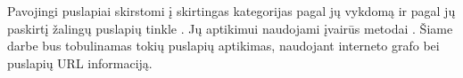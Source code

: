 
Pavojingi puslapiai skirstomi į skirtingas kategorijas pagal jų vykdomą \cite{tax} ir pagal jų paskirtį žalingų puslapių tinkle \cite{linchpins}. Jų aptikimui naudojami įvairūs metodai \cite{comp}. Šiame darbe bus tobulinamas tokių puslapių aptikimas, naudojant interneto grafo bei puslapių URL informaciją.






